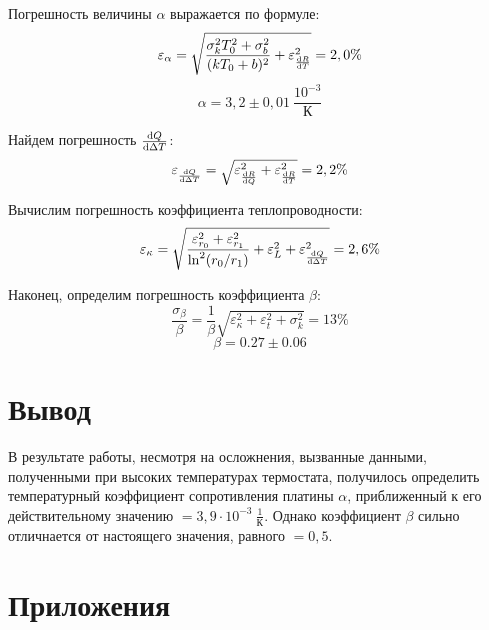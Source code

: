 \documentclass[12pt, a4paper]{article}
\begin{document}
Погрешность величины $\alpha$ выражается по формуле:
\[\varepsilon_{\alpha}=\sqrt{\frac{\sigma_k^2 T_0^2+\sigma_b^2}{(kT_0+b)^2}+\varepsilon_{\dv{R}{T}}^2}=2,0\%\]
\[\alpha=3,2\pm0,01\ \frac{10^{-3}}{К}\]

Найдем погрешность $\dv{Q}{\Delta T}$:
\[\varepsilon_{\dv{Q}{\Delta T}}=\sqrt{\varepsilon_{\dv{R}{Q}}^2 + \varepsilon_{\dv{R}{T}}^2}=2,2\%\]

Вычислим погрешность коэффициента теплопроводности:
\[\varepsilon_{\kappa}=\sqrt{\frac{\varepsilon_{r_0}^2+\varepsilon_{r_1}^2}{\ln^2(r_0/r_1)}+\varepsilon_{L}^2+\varepsilon_{\dv{Q}{\Delta T}}^2}=2,6\%\]

Наконец, определим погрешность коэффициента $\beta$:
\[\frac{\sigma_{\beta}}{\beta}=\frac{1}{\beta}\sqrt{\varepsilon_{\kappa}^2+\varepsilon_{t}^2+\sigma_{k}^2}=13\%\]
\[\beta=0.27\pm0.06\]

\section{Вывод}

В результате работы, несмотря на осложнения, вызванные данными, полученными при высоких температурах термостата, получилось определить температурный коэффициент  сопротивления платины $\alpha$, приближенный к его действительному значению $=3,9\cdot10^{-3}\ \frac{1}{К}$. Однако коэффициент $\beta$ сильно отличнается от настоящего значения, равного $=0,5$.

\section{Приложения}

\begin{table}[H]
\centering
{}
\caption{Значения $R_м$, подобранные для монотонного возрастания мощности, выделяемой нитью ($Q=\eta\cdot Q_{макс}$)}
\end{table}
\end{document}
